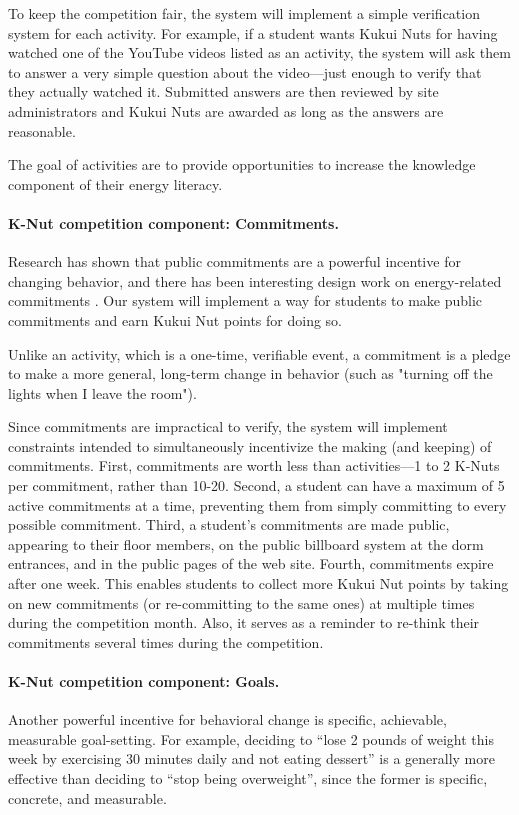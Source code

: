 \documentclass[11pt]{article}
\begin{document}
To keep the competition fair, the system will implement a simple
verification system for each activity.  For example, if a student wants
Kukui Nuts for having watched one of the YouTube videos listed as an
activity, the system will ask them to answer a very simple question about
the video---just enough to verify that they actually watched it.  Submitted
answers are then reviewed by site administrators and Kukui Nuts are awarded
as long as the answers are reasonable.

The goal of activities are to provide opportunities to increase
the knowledge component of their energy literacy.

\paragraph{K-Nut competition component: Commitments.}  Research has shown
that public commitments are a powerful incentive for changing behavior, and
there has been interesting design work on energy-related commitments
\cite{Pierce09,StepGreen}.  Our system will implement a way for students to
make public commitments and earn Kukui Nut points for doing so.

Unlike an activity, which is a one-time, verifiable event, a commitment is
a pledge to make a more general, long-term change in behavior (such as "turning off
the lights when I leave the room").

Since commitments are impractical to verify, the system will implement
constraints intended to simultaneously incentivize the making (and keeping)
of commitments.  First, commitments are worth less than activities---1 to 2
K-Nuts per commitment, rather than 10-20.  Second, a student can have a
maximum of 5 active commitments at a time, preventing them from simply
committing to every possible commitment.  Third, a student's commitments
are made public, appearing to their floor members, on the public billboard
system at the dorm entrances, and in the public pages of the web site.
Fourth, commitments expire after one week.  This enables students to
collect more Kukui Nut points by taking on new commitments (or
re-committing to the same ones) at multiple times during the competition
month.  Also, it serves as a reminder to re-think their commitments several
times during the competition.

\paragraph{K-Nut competition component: Goals.}  Another powerful incentive
for behavioral change is specific, achievable, measurable goal-setting.
For example, deciding to ``lose 2 pounds of weight this week by exercising
30 minutes daily and not eating dessert'' is a generally more effective
than deciding to ``stop being overweight'', since the former is specific,
concrete, and measurable.  
\end{document}
